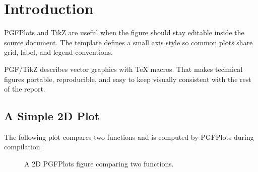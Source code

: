 

\section{Introduction}

PGFPlots and TikZ are useful when the figure should stay editable inside the
source document. The template defines a small  axis style so
common plots share grid, label, and legend conventions.

\begin{excerpt}
PGF/TikZ describes vector graphics with TeX macros. That makes technical
figures portable, reproducible, and easy to keep visually consistent with the
rest of the report.
\end{excerpt}

\subsection{A Simple 2D Plot}

The following plot compares two functions and is computed by PGFPlots during
compilation.

\begin{figure}[H]
  \centering
  \caption{A 2D PGFPlots figure comparing two functions.}
  \label{fig:two-dimensional-plot}
\end{figure}

